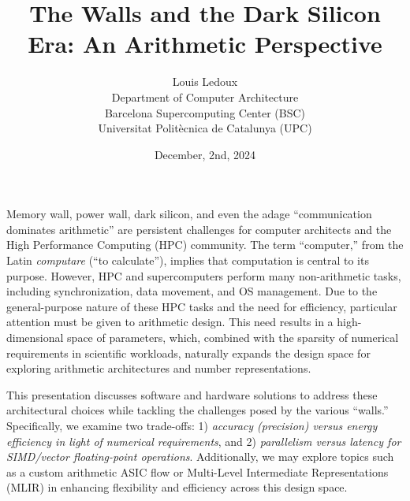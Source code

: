 \documentclass[11pt,a4paper]{article}
\title{The Walls and the Dark Silicon Era: An Arithmetic Perspective}
\author{Louis Ledoux \\
\small Department of Computer Architecture \\
\small Barcelona Supercomputing Center (BSC) \\
\small Universitat Polit\`ecnica de Catalunya (UPC)
}
\date{December, 2nd, 2024}  %
\begin{document}
\maketitle


Memory wall, power wall, dark silicon, and even the adage ``communication dominates arithmetic'' are persistent challenges for computer architects and the High Performance Computing (HPC) community.
The term ``computer,'' from the Latin \emph{computare} (``to calculate''), implies that computation is central to its purpose.
However, HPC and supercomputers perform many non-arithmetic tasks, including synchronization, data movement, and OS management.
Due to the general-purpose nature of these HPC tasks and the need for efficiency, particular attention must be given to arithmetic design.
This need results in a high-dimensional space of parameters, which, combined with the sparsity of numerical requirements in scientific workloads, naturally expands the design space for exploring arithmetic architectures and number representations.

This presentation discusses software and hardware solutions to address these architectural choices while tackling the challenges posed by the various ``walls.''
Specifically, we examine two trade-offs: 1) \textit{accuracy (precision) versus energy efficiency in light of numerical requirements}, and 2) \textit{parallelism versus latency for SIMD/vector floating-point operations}.
Additionally, we may explore topics such as a custom arithmetic ASIC flow or Multi-Level Intermediate Representations (MLIR) in enhancing flexibility and efficiency across this design space.
\end{document}

